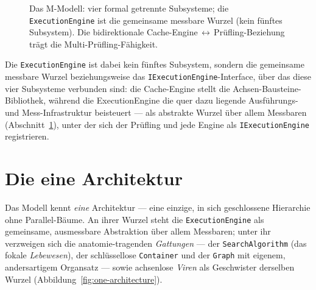 \begin{figure}[!htbp]
  \centering
  \caption{Das M-Modell: vier formal getrennte Subsysteme; die \texttt{ExecutionEngine} ist die
  gemeinsame messbare Wurzel (kein fünftes Subsystem). Die bidirektionale
  Cache-Engine\,$\leftrightarrow$\,Prüfling-Beziehung trägt die Multi-Prüfling-Fähigkeit.}\label{fig:m-model}
\end{figure}

Die \texttt{ExecutionEngine} ist dabei kein fünftes Subsystem, sondern die gemeinsame messbare
Wurzel beziehungsweise das \texttt{IExecutionEngine}-Interface, über das diese vier Subsysteme
verbunden sind: die Cache-Engine stellt die Achsen-Bausteine-Bibliothek, während die ExecutionEngine
die quer dazu liegende Ausführungs- und Mess-Infrastruktur beisteuert --- als abstrakte Wurzel über
allem Messbaren (Abschnitt~\ref{sec:three-layer}), unter der sich der Prüfling und jede Engine als
\texttt{IExecutionEngine} registrieren.

\section{Die eine Architektur}\label{sec:three-layer}

Das Modell kennt \emph{eine} Architektur --- eine einzige, in sich geschlossene Hierarchie ohne
Parallel-Bäume. An ihrer Wurzel steht die \texttt{ExecutionEngine} als gemeinsame, ausmessbare
Abstraktion über allem Messbaren; unter ihr verzweigen sich die anatomie-tragenden \emph{Gattungen} --- der \texttt{SearchAlgorithm}
(das fokale \emph{Lebewesen}), der schlüssellose \texttt{Container} und der \texttt{Graph} mit
eigenem, andersartigem Organsatz --- sowie achsenlose \emph{Viren} als Geschwister derselben Wurzel
(Abbildung~\ref{fig:one-architecture}).

